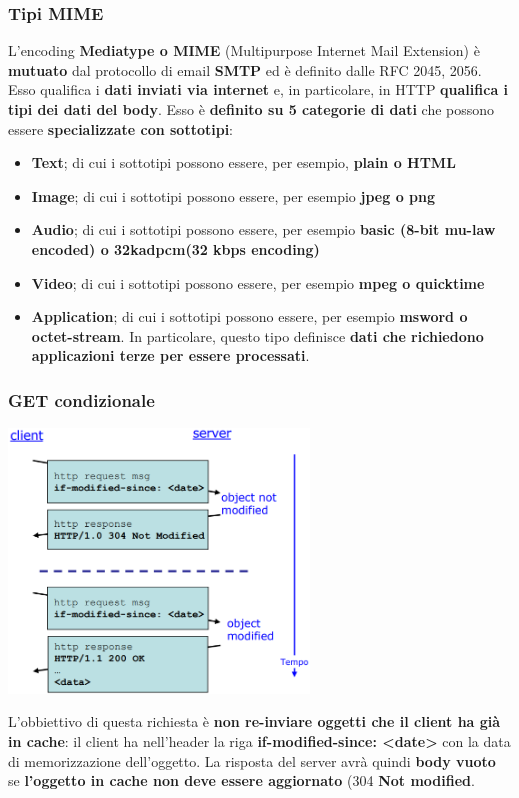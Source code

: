 \documentclass[12pt]{article}
\begin{document}
\subsubsection{Tipi MIME}
L'encoding \textbf{Mediatype o MIME} (Multipurpose Internet Mail Extension) è \textbf{mutuato} dal protocollo di email \textbf{SMTP} ed è definito dalle RFC 2045, 2056. Esso qualifica i \textbf{dati inviati via internet} e, in particolare, in HTTP \textbf{qualifica i tipi dei dati del body}. Esso è \textbf{definito su 5 categorie di dati} che possono essere \textbf{specializzate con sottotipi}:
\begin{itemize}
    \item \textbf{Text}; di cui i sottotipi possono essere, per esempio, \textbf{plain o HTML}
    \item \textbf{Image};  di cui i sottotipi possono essere, per esempio \textbf{jpeg o png}
    \item \textbf{Audio};  di cui i sottotipi possono essere, per esempio \textbf{basic (8-bit mu-law encoded) o 32kadpcm(32 kbps encoding)}
    \item \textbf{Video};  di cui i sottotipi possono essere, per esempio \textbf{mpeg o quicktime}
    \item \textbf{Application};  di cui i sottotipi possono essere, per esempio \textbf{msword o octet-stream}. In particolare, questo tipo definisce \textbf{dati che richiedono applicazioni terze per essere processati}.
\end{itemize}
\subsubsection{GET condizionale}
\begin{center}
    \includegraphics[width = 0.60\textwidth]{Images/125.PNG}
\end{center}
L'obbiettivo di questa richiesta è \textbf{non re-inviare oggetti che il client ha già in cache}: il client ha nell'header la riga \textbf{if-modified-since: <date>} con la data di memorizzazione dell'oggetto. La risposta del server avrà quindi \textbf{body vuoto} se \textbf{l'oggetto in cache non deve essere aggiornato} (304 \textbf{Not modified}.
\end{document}
